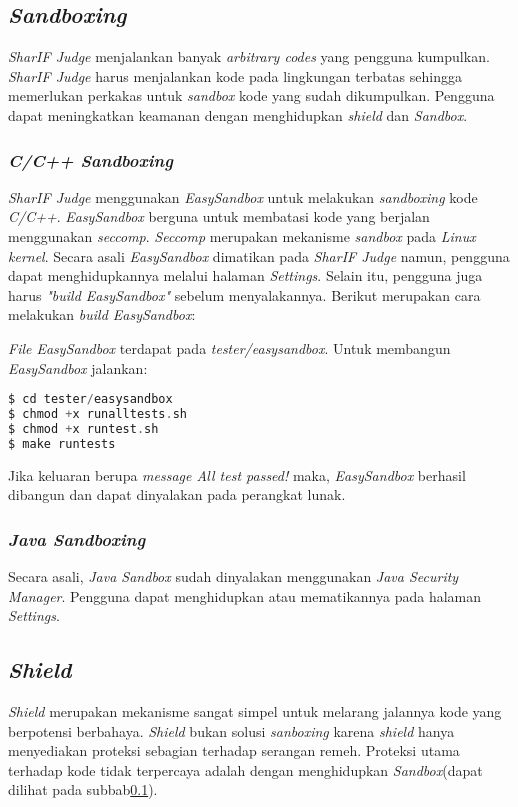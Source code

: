 \subsection{\textit{Sandboxing}}
\label{subsec:sandboxing}
\textit{SharIF Judge} menjalankan banyak \textit{arbitrary codes} yang pengguna kumpulkan. \textit{SharIF Judge} harus menjalankan kode pada lingkungan terbatas sehingga memerlukan perkakas untuk \textit{sandbox} kode yang sudah dikumpulkan. Pengguna dapat meningkatkan keamanan dengan menghidupkan \textit{shield} dan \textit{Sandbox}.

\subsubsection{\textit{C/C++ Sandboxing}}
\textit{SharIF Judge} menggunakan \textit{EasySandbox} untuk melakukan \textit{sandboxing} kode \textit{C/C++}. \textit{EasySandbox} berguna untuk membatasi kode yang berjalan menggunakan \textit{seccomp}. \textit{Seccomp} merupakan mekanisme \textit{sandbox} pada \textit{Linux kernel}. Secara asali \textit{EasySandbox} dimatikan pada \textit{SharIF Judge} namun, pengguna dapat menghidupkannya melalui halaman \textit{Settings}. Selain itu, pengguna juga harus \textit{"build EasySandbox"} sebelum menyalakannya. Berikut merupakan cara melakukan \textit{build EasySandbox}:

\textit{File EasySandbox} terdapat pada \textit{tester/easysandbox}. Untuk membangun \textit{EasySandbox} jalankan:

\begin{lstlisting}[language=C,caption=Kode \textit{runcode.sh} awal, label=kode:easysandbox]
$ cd tester/easysandbox
$ chmod +x runalltests.sh
$ chmod +x runtest.sh
$ make runtests
\end{lstlisting}

Jika keluaran berupa \textit{message All test passed!} maka, \textit{EasySandbox} berhasil dibangun dan dapat dinyalakan pada perangkat lunak.

\subsubsection{\textit{Java Sandboxing}}
Secara asali, \textit{Java Sandbox} sudah dinyalakan menggunakan \textit{Java Security Manager}. Pengguna dapat menghidupkan atau mematikannya pada halaman \textit{Settings}.

\subsection{\textit{Shield}}
\label{subsec:shield}
\textit{Shield} merupakan mekanisme sangat simpel untuk melarang jalannya kode yang berpotensi berbahaya. \textit{Shield} bukan solusi \textit{sanboxing} karena \textit{shield} hanya menyediakan proteksi sebagian terhadap serangan remeh. Proteksi utama terhadap kode tidak terpercaya adalah dengan menghidupkan \textit{Sandbox}(dapat dilihat pada subbab\ref{subsec:sandboxing}).

